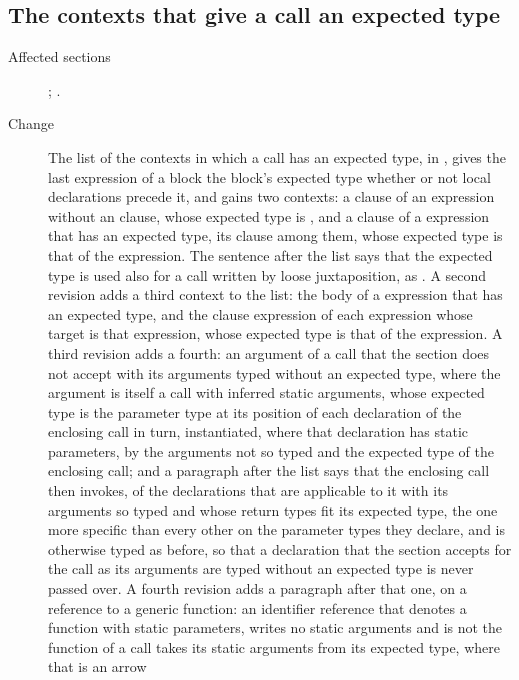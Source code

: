 \subsection{The contexts that give a call an expected type}

\begin{description}
\item[Affected sections] ; .
\item[Change] The list of the contexts in which a call has an expected type,
in , gives the last expression of a block the
block's expected type whether or not local declarations precede it, and gains
two contexts: a clause of an  expression without an  clause,
whose expected type is \TYP{()}, and a clause of a  expression
that has an expected type, its  clause among them, whose expected
type is that of the  expression.
The sentence after the list says that the expected type is used also for a call
written by loose juxtaposition, as .
A second revision adds a third context to the list: the body of a 
expression that has an expected type, and the  clause expression of
each  expression whose target is that  expression, whose
expected type is that of the  expression.
A third revision adds a fourth: an argument of a call that the section does not
accept with its arguments typed without an expected type, where the argument is
itself a call with inferred static arguments, whose expected type is
the parameter type at its position of each declaration of the enclosing call in
turn, instantiated, where that declaration has static parameters, by the
arguments not so typed and the expected type of the enclosing call; and a
paragraph after the list says that the enclosing call then invokes, of the
declarations that are applicable to it with its arguments so typed and whose
return types fit its expected type, the one more specific than every other on
the parameter types they declare, and is otherwise typed as before, so that a
declaration that the section accepts for the call as its arguments are typed
without an expected type is never passed over.
A fourth revision adds a paragraph after that one, on a reference to a generic
function: an identifier reference that denotes a function with static
parameters, writes no static arguments and is not the function of a call
takes its static arguments from its expected type, where that is an arrow

\end{description}
